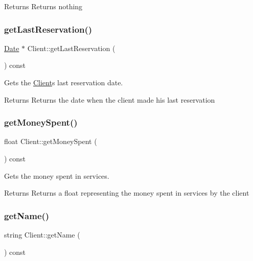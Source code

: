 \begin{DoxyReturn}{Returns}
Returns nothing 
\end{DoxyReturn}
\mbox{\label{class_client_a271a8c69a39636c6a4f40fd6653b5465}} 
\subsubsection{\texorpdfstring{get\+Last\+Reservation()}{getLastReservation()}}
{\footnotesize\ttfamily \hyperlink{class_date}{Date} $\ast$ Client\+::get\+Last\+Reservation (\begin{DoxyParamCaption}{ }\end{DoxyParamCaption}) const}



Gets the \hyperlink{class_client}{Client}\textquotesingle{}s last reservation date. 

\begin{DoxyReturn}{Returns}
Returns the date when the client made his last reservation 
\end{DoxyReturn}
\mbox{\label{class_client_a226ff919591e7fdfa6c386e9aa5300a5}} 
\subsubsection{\texorpdfstring{get\+Money\+Spent()}{getMoneySpent()}}
{\footnotesize\ttfamily float Client\+::get\+Money\+Spent (\begin{DoxyParamCaption}{ }\end{DoxyParamCaption}) const}



Gets the money spent in services. 

\begin{DoxyReturn}{Returns}
Returns a float representing the money spent in services by the client 
\end{DoxyReturn}
\mbox{\label{class_client_a5c473ba52d7678744edec9e51052c947}} 
\subsubsection{\texorpdfstring{get\+Name()}{getName()}}
{\footnotesize\ttfamily string Client\+::get\+Name (\begin{DoxyParamCaption}{ }\end{DoxyParamCaption}) const}



